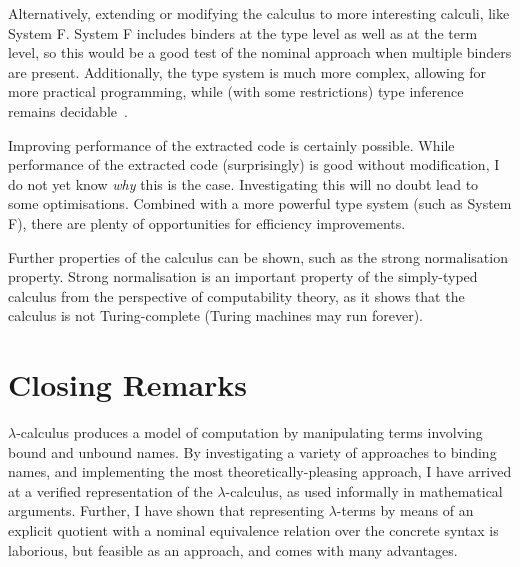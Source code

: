 Alternatively, extending or modifying the calculus to more interesting calculi, like System F.
System F includes binders at the type level as well as at the term level, so this would be a good test of the nominal approach when multiple binders are present.
Additionally, the type system is much more complex, allowing for more practical programming, while (with some restrictions) type inference remains decidable~\cite{hindley-milner}.

Improving performance of the extracted code is certainly possible.
While performance of the extracted code (surprisingly) is good without modification, I do not yet know \emph{why} this is the case.
Investigating this will no doubt lead to some optimisations.
Combined with a more powerful type system (such as System F), there are plenty of opportunities for efficiency improvements.

Further properties of the calculus can be shown, such as the strong normalisation property.
Strong normalisation is an important property of the simply-typed calculus from the perspective of computability theory, as it shows that the calculus is not Turing-complete (Turing machines may run forever).

\section{Closing Remarks}
\(\lambda\)-calculus produces a model of computation by manipulating terms involving bound and unbound names.
By investigating a variety of approaches to binding names, and implementing the most theoretically-pleasing approach, I have arrived at a verified representation of the \(\lambda\)-calculus, as used informally in mathematical arguments.
Further, I have shown that representing \(\lambda\)-terms by means of an explicit quotient with a nominal equivalence relation over the concrete syntax is laborious, but feasible as an approach, and comes with many advantages.
